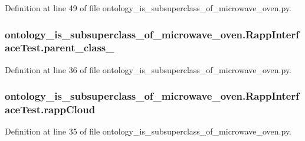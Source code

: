 Definition at line 49 of file ontology\-\_\-is\-\_\-subsuperclass\-\_\-of\-\_\-microwave\-\_\-oven.\-py.

\hypertarget{classontology__is__subsuperclass__of__microwave__oven_1_1RappInterfaceTest_a8b1c7e0c904292b4c01a13d4ccdfb66d}{
\subsubsection[{parent\-\_\-class\-\_\-}]{\setlength{\rightskip}{0pt plus 5cm}ontology\-\_\-is\-\_\-subsuperclass\-\_\-of\-\_\-microwave\-\_\-oven.\-Rapp\-Interface\-Test.\-parent\-\_\-class\-\_\-}}\label{classontology__is__subsuperclass__of__microwave__oven_1_1RappInterfaceTest_a8b1c7e0c904292b4c01a13d4ccdfb66d}


Definition at line 36 of file ontology\-\_\-is\-\_\-subsuperclass\-\_\-of\-\_\-microwave\-\_\-oven.\-py.

\hypertarget{classontology__is__subsuperclass__of__microwave__oven_1_1RappInterfaceTest_a5e306b1833a055b0523bc96984d4fc8b}{
\subsubsection[{rapp\-Cloud}]{\setlength{\rightskip}{0pt plus 5cm}ontology\-\_\-is\-\_\-subsuperclass\-\_\-of\-\_\-microwave\-\_\-oven.\-Rapp\-Interface\-Test.\-rapp\-Cloud}}\label{classontology__is__subsuperclass__of__microwave__oven_1_1RappInterfaceTest_a5e306b1833a055b0523bc96984d4fc8b}


Definition at line 35 of file ontology\-\_\-is\-\_\-subsuperclass\-\_\-of\-\_\-microwave\-\_\-oven.\-py.

